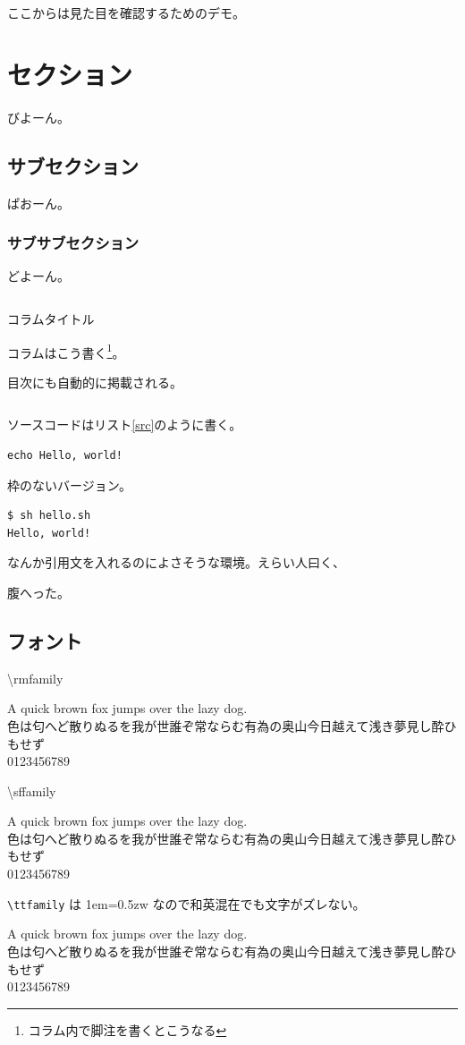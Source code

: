 ここからは見た目を確認するためのデモ。

\section{セクション}

びよーん。


\subsection{サブセクション}

ぱおーん。

\subsubsection{サブサブセクション}

どよーん。

\begin{column}{コラムタイトル}

コラムはこう書く\footnote{コラム内で脚注を書くとこうなる}。

目次にも自動的に掲載される。

\end{column}

ソースコードはリスト\ref{src}のように書く。

\begin{lstlisting}[caption=hello.sh, label=src]
echo Hello, world!
\end{lstlisting}

枠のないバージョン。

\begin{lstlisting}[style=simple]
$ sh hello.sh
Hello, world!
\end{lstlisting}

なんか引用文を入れるのによさそうな環境。えらい人曰く、

\begin{leftbar}
腹へった。
\end{leftbar}

\subsection{フォント}

\def\sampletext{\noindent%
A quick brown fox jumps over the lazy dog. \\
色は匂へど散りぬるを我が世誰ぞ常ならむ有為の奥山今日越えて浅き夢見し酔ひもせず\\
0123456789
}

\textrm{\textbackslash{}rmfamily}
\begin{snugshade}
\rmfamily\sampletext
\end{snugshade}

\textsf{\textbackslash{}sffamily}
\begin{snugshade}
\sffamily\sampletext
\end{snugshade}

\texttt{\textbackslash{}ttfamily} は 1em=0.5zw なので和英混在でも文字がズレない。
\begin{snugshade}
\ttfamily\sampletext
\end{snugshade}
